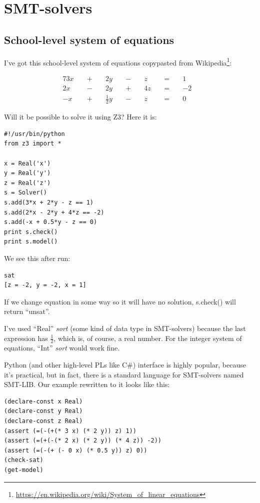 \section{\ac{SMT}-solvers}

\subsection{School-level system of equations}

I've got this school-level system of equations copypasted from Wikipedia\footnote{\url{https://en.wikipedia.org/wiki/System_of_linear_equations}}:

\begin{alignat*}{7}
3x &&\; + \;&& 2y             &&\; - \;&& z  &&\; = \;&& 1 & \\
2x &&\; - \;&& 2y             &&\; + \;&& 4z &&\; = \;&& -2 & \\
-x &&\; + \;&& \tfrac{1}{2} y &&\; - \;&& z  &&\; = \;&& 0 &
\end{alignat*}

Will it be possible to solve it using Z3? Here it is:

\begin{lstlisting}
#!/usr/bin/python
from z3 import *

x = Real('x')
y = Real('y')
z = Real('z')
s = Solver()
s.add(3*x + 2*y - z == 1)
s.add(2*x - 2*y + 4*z == -2)
s.add(-x + 0.5*y - z == 0)
print s.check()
print s.model()
\end{lstlisting}

We see this after run:

\begin{lstlisting}
sat
[z = -2, y = -2, x = 1]
\end{lstlisting}

If we change equation in some way so it will have no solution, s.check() will return ``unsat''.

I've used ``Real'' \textit{sort} (some kind of data type in \ac{SMT}-solvers) because the last expression has $\frac{1}{2}$, which is, of course, a real number.
For the integer system of equations, ``Int'' \textit{sort} would work fine.

Python (and other high-level PLs like C\#) interface is highly popular, because it's practical, but in fact, 
there is a standard language for \ac{SMT}-solvers named SMT-LIB\cite{SMTLIB}.
Our example rewritten to it looks like this:

\begin{lstlisting}
(declare-const x Real)
(declare-const y Real)
(declare-const z Real)
(assert (=(-(+(* 3 x) (* 2 y)) z) 1))
(assert (=(+(-(* 2 x) (* 2 y)) (* 4 z)) -2))
(assert (=(-(+ (- 0 x) (* 0.5 y)) z) 0))
(check-sat)
(get-model)
\end{lstlisting}

